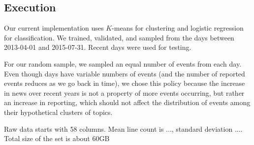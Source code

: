 \subsection{Execution}

Our current implementation uses $K$-means for clustering and logistic regression for classification. We trained, validated, and sampled from the days between 2013-04-01 and 2015-07-31. Recent days were used for testing.

For our random sample, we sampled an equal number of events from each day. Even though days have variable numbers of events (and the number of reported events reduces as we go back in time), we chose this policy because the increase in news over recent years is not a property of more events occurring, but rather an increase in reporting, which should not affect the distribution of events among their hypothetical clusters of topics.

Raw data starts with 58 columns. Mean line count is ..., standard deviation .... Total size of the set is about 60GB

